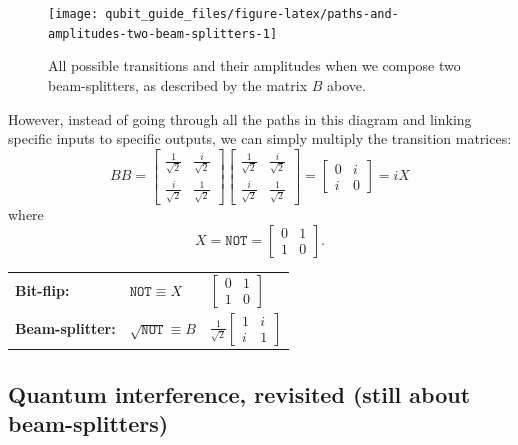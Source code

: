 \documentclass[fleqn,a4paper]{article}
\newenvironment{idea}{\everypar{\setlength{\parindent}{1.5em}}}{}
\theoremstyle{definition}
\theoremstyle{definition}
\theoremstyle{definition}
\theoremstyle{definition}
\theoremstyle{remark}
\begin{document}
\begin{figure}[H]

{\centering \texttt{[image: qubit\_guide\_files/figure-latex/paths-and-amplitudes-two-beam-splitters-1]} 

}

\caption{All possible transitions and their amplitudes when we compose two beam-splitters, as described by the matrix $B$ above.}\label{fig:paths-and-amplitudes-two-beam-splitters}
\end{figure}

However, instead of going through all the paths in this diagram and linking specific inputs to specific outputs, we can simply multiply the transition matrices:
\[
  BB =
  \begin{bmatrix}
    \frac{1}{\sqrt{2}} & \frac{i}{\sqrt{2}}\\
    \frac{i}{\sqrt{2}} & \frac{1}{\sqrt{2}}
  \end{bmatrix}
  \begin{bmatrix}
    \frac{1}{\sqrt{2}} & \frac{i}{\sqrt{2}}\\
    \frac{i}{\sqrt{2}} & \frac{1}{\sqrt{2}}
  \end{bmatrix}
  = \begin{bmatrix}
  0 & i\\
  i & 0
  \end{bmatrix}
  = iX
\]
where
\[
  X = \texttt{NOT} = \begin{bmatrix}0&1\\1&0\end{bmatrix}.
\]

\begin{idea}

\centering
\begin{tabular}{lll}
  \textbf{Bit-flip:}
  & $\texttt{NOT}\equiv X$
  & $\begin{bmatrix}0&1\\1&0\end{bmatrix}$
\\[2em]
  \textbf{Beam-splitter:}
  & $\sqrt{\texttt{NOT}}\equiv B$
  & $\frac{1}{\sqrt{2}}\begin{bmatrix}1&i\\i&1\end{bmatrix}$
\end{tabular}

\end{idea}

\hypertarget{quantum-interference-revisited-still-about-beam-splitters}{%
\subsection{Quantum interference, revisited (still about beam-splitters)}\label{quantum-interference-revisited-still-about-beam-splitters}}
\end{document}
